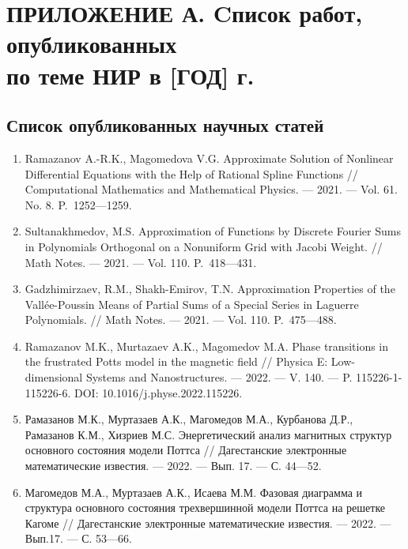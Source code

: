 \chapter{ПРИЛОЖЕНИЕ А. Cписок работ, опубликованных \texorpdfstring{\\ }{} по теме НИР в [ГОД] г.}


\section*{Список опубликованных научных статей}

\begin{enumerate}[1]
    \item
    Ramazanov A.-R.K., Magomedova V.G. Approximate Solution of Nonlinear Differential Equations with the Help of Rational Spline Functions // Computational Mathematics and Mathematical Physics. --- 2021. --- Vol. 61. No. 8. P.~1252---1259.

    \item
    Sultanakhmedov, M.S. Approximation of Functions by Discrete Fourier Sums in Polynomials Orthogonal on a Nonuniform Grid with Jacobi Weight. // Math Notes. --- 2021. --- Vol. 110. P.~418---431.

    \item
    Gadzhimirzaev, R.M., Shakh-Emirov, T.N. Approximation Properties of the Vallée-Poussin Means of Partial Sums of a Special Series in Laguerre Polynomials. // Math Notes. --- 2021. --- Vol. 110. P.~475---488.


    
    \item
    Ramazanov M.K., Murtazaev A.K., Magomedov M.A. Phase transitions in the frustrated Potts model in the magnetic field // Physica E: Low-dimensional Systems and Nanostructures.
    --- 2022.
    --- V. 140.
    --- P. 115226-1-115226-6. DOI: 10.1016/j.physe.2022.115226.
    
    \item
    Рамазанов М.К., Муртазаев А.К., Магомедов М.А., Курбанова Д.Р., Рамазанов К.М., Хизриев М.С. Энергетический анализ магнитных структур основного состояния модели Поттса // Дагестанские электронные математические известия.
    --- 2022.
    --- Вып. 17.
    --- С. 44---52.
    
    \item
    Магомедов М.А., Муртазаев А.К., Исаева М.М. Фазовая диаграмма и структура основного состояния трехвершинной модели Поттса на решетке Кагоме // Дагестанские электронные математические известия.
    --- 2022.
    --- Вып.17.
    --- С. 53---66.
    

\end{enumerate}
